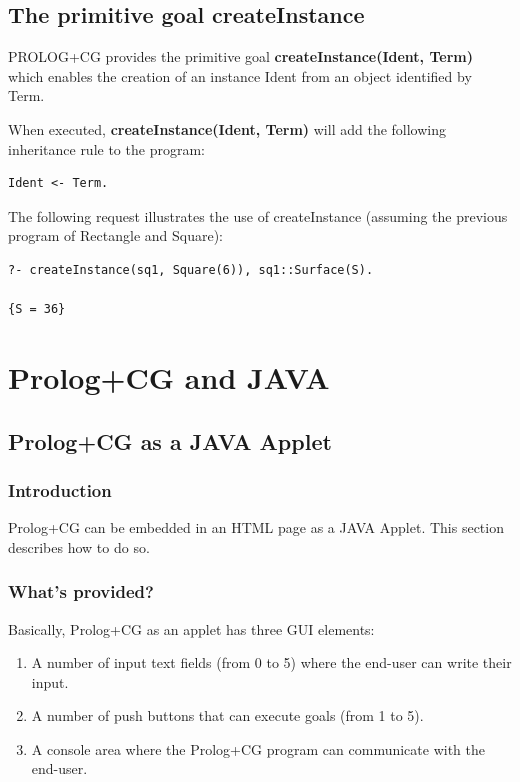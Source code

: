 \documentclass{book}
\begin{document}
\section{The primitive goal createInstance}\label{Sec:CreateInstance}

PROLOG+CG provides the primitive goal {\bf createInstance(Ident,
Term)} which enables the creation of an instance Ident from an object
identified by Term.

When executed, {\bf createInstance(Ident, Term)} will add the
following inheritance rule to the program:

\begin{verbatim}
Ident <- Term.
\end{verbatim}

The following request illustrates the use
of createInstance (assuming the previous program of Rectangle and
Square):

\begin{verbatim}
?- createInstance(sq1, Square(6)), sq1::Surface(S).

{S = 36}
\end{verbatim}



\chapter{Prolog+CG and JAVA}

\section{Prolog+CG as a JAVA Applet}\label{Sec:JavaApplet}

\subsection{Introduction}

Prolog+CG can be embedded in an HTML page as a JAVA Applet.  This
section describes how to do so.

\subsection{What's provided?}

Basically, Prolog+CG as an applet has three GUI elements:

\begin{enumerate}

  \item A number of input text fields (from 0 to 5) where the end-user
  can write their input.

  \item A number of push buttons that can execute goals (from 1 to 5).

  \item A console area where the Prolog+CG program can communicate with
  the end-user.

\end{enumerate}
\end{document}

